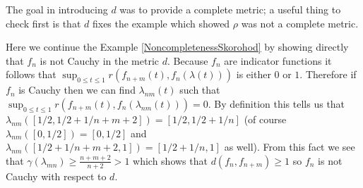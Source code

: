 The goal in introducing $d$ was to provide a complete metric; a useful
thing to check first is that $d$ fixes the example which showed $\rho$
was not a complete metric.
\begin{examp}Here we continue the Example
  \ref{NoncompletenessSkorohod} by showing directly that $f_n$ is not
  Cauchy in the metric $d$.  Because $f_n$ are indicator functions it
  follows that $\sup_{0 \leq t \leq 1} r(f_{n+m}(t), f_{n}(\lambda(t)))$ is
  either $0$ or $1$.  Therefore if $f_n$ is Cauchy then we can find
  $\lambda_{nm}(t)$ such that $\sup_{0 \leq t \leq 1} r(f_{n+m}(t),
    f_{n}(\lambda_{nm}(t))) = 0$.  By definition this tells us that
  $\lambda_{nm}([1/2,1/2 + 1/n+m+2]) =  [1/2,1/2+1/n]$ 
(of course $\lambda_{nm}([0,1/2]) = [0,1/2]$ and
$\lambda_{nm}([1/2 + 1/n+m+2, 1]) = [1/2 + 1/n,1]$ as well).  
From this fact we see that $\gamma(\lambda_{mn}) \geq
\frac{n+m+2}{n+2} > 1$ which shows that $d(f_n, f_{n+m}) \geq 1$ so
$f_n$ is not Cauchy with respect to $d$.
\end{examp}

